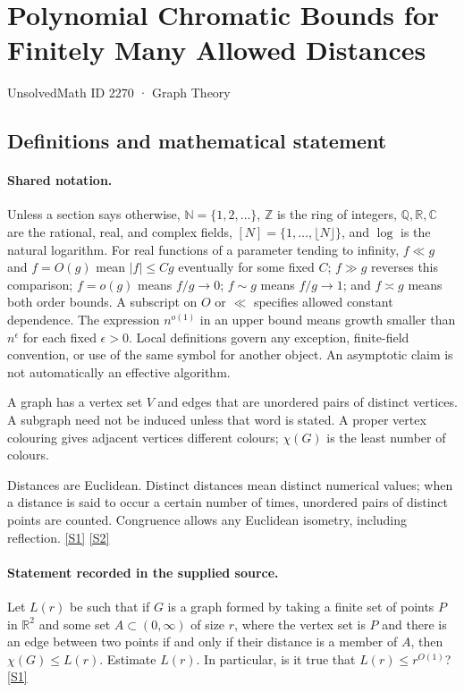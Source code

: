 \documentclass[11pt,a4paper]{article}
\newcommand{\N}{\mathbb{N}}
\newcommand{\Z}{\mathbb{Z}}
\newcommand{\Q}{\mathbb{Q}}
\newcommand{\R}{\mathbb{R}}
\newcommand{\C}{\mathbb{C}}
\newcommand{\sref}[2]{\hyperlink{source:#1:#2}{[S#2]}}
\begin{document}

\setcounter{section}{2269}

\section{Polynomial Chromatic Bounds for Finitely Many Allowed Distances}\label{2270}

{\small\sffamily UnsolvedMath ID 2270 · Graph Theory}

\subsection{Definitions and mathematical statement}

\paragraph{Shared notation.}Unless a section says otherwise, $\N=\{1,2,\ldots\}$,
$\Z$ is the ring of integers, $\Q,\R,\C$ are the rational, real, and complex
fields, $[N]=\{1,\ldots,\lfloor N\rfloor\}$, and $\log$ is the natural
logarithm. For real functions of a parameter tending to infinity,
$f\ll g$ and $f=O(g)$ mean $|f|\leq Cg$ eventually for some fixed $C$;
$f\gg g$ reverses this comparison; $f=o(g)$ means $f/g\to0$;
$f\sim g$ means $f/g\to1$; and $f\asymp g$ means both order bounds.
A subscript on $O$ or $\ll$ specifies allowed constant dependence.
The expression $n^{o(1)}$ in an upper bound means growth smaller than
$n^\epsilon$ for each fixed $\epsilon>0$. Local definitions govern any
exception, finite-field convention, or use of the same symbol for another
object. An asymptotic claim is not automatically an effective algorithm.



A graph has a vertex set $V$ and edges that are unordered pairs of distinct vertices. A subgraph need not be induced unless that word is stated. A proper vertex colouring gives adjacent vertices different colours; $\chi(G)$ is the least number of colours.

Distances are Euclidean. Distinct distances mean distinct numerical values; when a distance is said to occur a certain number of times, unordered pairs of distinct points are counted. Congruence allows any Euclidean isometry, including reflection. \sref{2270}{1} \sref{2270}{2}

\paragraph{Statement recorded in the supplied source.}
Let $L(r)$ be such that if $G$ is a graph formed by taking a finite set of points $P$ in $\mathbb{R}^2$ and some set $A\subset (0,\infty)$ of size $r$, where the vertex set is $P$ and there is an edge between two points if and only if their distance is a member of $A$, then $\chi(G)\leq L(r)$.
Estimate $L(r)$. In particular, is it true that $L(r)\leq r^{O(1)}$? \sref{2270}{1}
\end{document}
